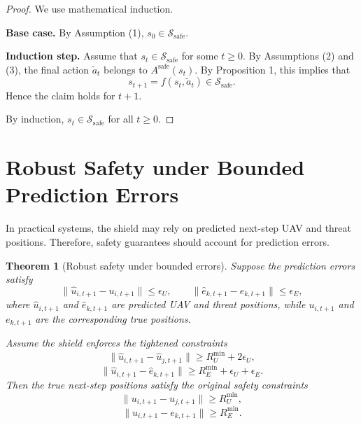 \documentclass[11pt]{article}
\newtheorem{theorem}{Theorem}
\begin{document}
\begin{proof}
We use mathematical induction.

\textbf{Base case.} By Assumption (1), $s_0 \in \mathcal S_{\mathrm{safe}}$.

\textbf{Induction step.} Assume that $s_t \in \mathcal S_{\mathrm{safe}}$ for some $t \ge 0$. By Assumptions (2) and (3), the final action $\tilde a_t$ belongs to $A^{\mathrm{safe}}(s_t)$. By Proposition 1, this implies that
\begin{equation}
s_{t+1} = f(s_t,\tilde a_t) \in \mathcal S_{\mathrm{safe}}.
\end{equation}
Hence the claim holds for $t+1$.

By induction, $s_t \in \mathcal S_{\mathrm{safe}}$ for all $t \ge 0$.
\end{proof}

\section{Robust Safety under Bounded Prediction Errors}

In practical systems, the shield may rely on predicted next-step UAV and threat positions. Therefore, safety guarantees should account for prediction errors.

\begin{theorem}[Robust safety under bounded errors]
Suppose the prediction errors satisfy
\begin{equation}
\|\hat u_{i,t+1} - u_{i,t+1}\| \le \epsilon_U,\qquad
\|\hat e_{k,t+1} - e_{k,t+1}\| \le \epsilon_E,
\end{equation}
where $\hat u_{i,t+1}$ and $\hat e_{k,t+1}$ are predicted UAV and threat positions, while $u_{i,t+1}$ and $e_{k,t+1}$ are the corresponding true positions.

Assume the shield enforces the tightened constraints
\begin{equation}
\|\hat u_{i,t+1} - \hat u_{j,t+1}\| \ge R_U^{\min} + 2\epsilon_U,
\end{equation}
\begin{equation}
\|\hat u_{i,t+1} - \hat e_{k,t+1}\| \ge R_E^{\min} + \epsilon_U + \epsilon_E.
\end{equation}
Then the true next-step positions satisfy the original safety constraints
\begin{equation}
\|u_{i,t+1} - u_{j,t+1}\| \ge R_U^{\min},
\end{equation}
\begin{equation}
\|u_{i,t+1} - e_{k,t+1}\| \ge R_E^{\min}.
\end{equation}
\end{theorem}
\end{document}
